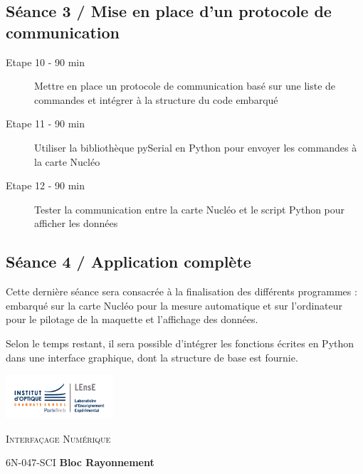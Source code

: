 \documentclass[a4paper,11pt,titlepage]{article} %
\begin{document}
\subsection{Séance 3 / Mise en place d'un protocole de communication}

	\begin{description}
		\item[Etape 10 - 90 min] Mettre en place un protocole de communication basé sur une liste de commandes et intégrer à la structure du code embarqué
		\item[Etape 11 - 90 min] Utiliser la bibliothèque pySerial en Python pour envoyer les commandes à la carte Nucléo
		\item[Etape 12 - 90 min] Tester la communication entre la carte Nucléo et le script Python pour afficher les données
	\end{description}

\medskip


\subsection{Séance 4 / Application complète}

Cette dernière séance sera consacrée à la finalisation des différents programmes : embarqué sur la carte Nucléo pour la mesure automatique et sur l'ordinateur pour le pilotage de la maquette et l'affichage des données.

Selon le temps restant, il sera possible d'intégrer les fonctions écrites en Python dans une interface graphique, dont la structure de base est fournie.


\cleardoublepage
\strut %

\begin{minipage}[c]{.25\linewidth}
	\includegraphics[width=4cm]{images/Logo-LEnsE.png}
\end{minipage} \hfill
\begin{minipage}[c]{.4\linewidth}

\begin{center}
\vspace{0.3cm}
{\Large \textsc{Interfaçage Numérique}}

\medskip

6N-047-SCI \qquad \textbf{\large Bloc Rayonnement}

\end{center}
\end{minipage}\hfill
\end{document}
